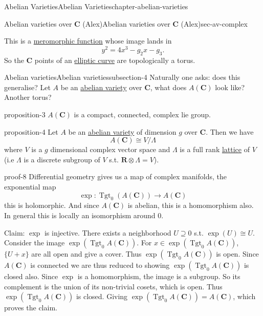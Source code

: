 \documentclass[oneside,10pt,]{book}
\numberwithin{equation}{section}
\newcommand{\RR}{\mathbf{R}}
\newcommand{\CC}{\mathbf{C}}
\DeclareMathOperator{\Tgt}{Tgt}
\begin{document}
\begin{chapterptx}{Abelian Varieties}{}{Abelian Varieties}{}{}{chapter-abelian-varieties}
\begin{sectionptx}{Abelian varieties over \(\CC\) (Alex)}{}{Abelian varieties over \(\CC\) (Alex)}{}{}{sec-av-complex}
\begin{introduction}{}
This is a \hyperref[def-morph-riem-surf]{meromorphic function} whose image lands in%
\begin{equation*}
y^2 = 4x^3 - g_2 x - g_3\text{.}
\end{equation*}
So the \(\CC\) points of an \hyperref[def-supersing-isog-ec]{elliptic curve} are topologically a torus.%
\end{introduction}%
%
%
\typeout{************************************************}
\typeout{************************************************}
%
\begin{subsectionptx}{Abelian varieties}{}{Abelian varieties}{}{}{subsection-4}
\hypertarget{p-40}{}%
Naturally one asks: does this generalise? Let \(A\) be an \hyperref[def-buntes-abvar]{abelian variety} over \(\CC\), what does \(A(\CC)\) look like? Another torus?%
\begin{proposition}{}{}{proposition-3}%
\hypertarget{p-41}{}%
\(A(\CC)\) is a compact, connected, complex lie group.%
\end{proposition}
\begin{proposition}{}{}{proposition-4}%
\hypertarget{p-42}{}%
Let \(A\) be an \hyperref[def-buntes-abvar]{abelian variety} of dimension \(g\) over \(\CC\). Then we have%
\begin{equation*}
A(\CC) \cong V/\Lambda
\end{equation*}
where \(V\) is a \(g\) dimensional complex vector space and \(\Lambda\) is a full rank \hyperref[def-buntes-lattice]{lattice} of \(V\) (i.e \(\Lambda\) is a discrete subgroup of \(V\) s.t. \(\RR\otimes \Lambda  = V\)).%
\end{proposition}
\begin{proofptx}{}{proof-8}
\hypertarget{p-43}{}%
Differential geometry gives us a map of complex manifolds, the exponential map%
\begin{equation*}
\exp\colon\Tgt_0(A(\CC)) \to A(\CC)
\end{equation*}
this is holomorphic. And since \(A(\CC)\) is abelian, this is a homomorphism also. In general this is locally an isomorphism around 0.%
\par
\hypertarget{p-44}{}%
Claim: \(\exp\) is injective. There exists a neighborhood \(U\supseteq 0\) s.t. \(\exp(U) \cong U\). Consider the image \(\exp(\Tgt_0 A(\CC))\). For \(x\in \exp(\Tgt_0 A(\CC))\), \(\{U+x\}\) are all open and give a cover. Thus \(\exp(\Tgt_0A(\CC))\) is open. Since \(A(\CC)\) is connected we are thus reduced to showing \(\exp(\Tgt_0 A(\CC))\) is closed also. Since \(\exp\) is a homomorphism, the image is a subgroup. So its complement is the union of its non-trivial cosets, which is open. Thus \(\exp(\Tgt_0A(\CC))\) is closed. Giving \(\exp(\Tgt_0A(\CC)) = A(\CC)\), which proves the claim.%

\end{proofptx}
\end{subsectionptx}
\end{sectionptx}
\end{chapterptx}
\end{document}
